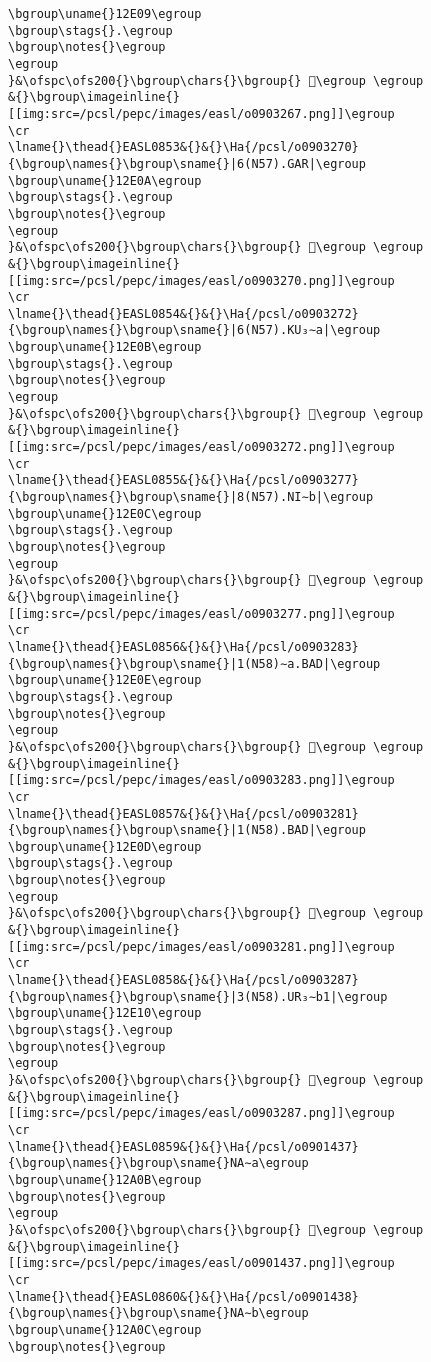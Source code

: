 \begin{verbatim}
\bgroup\uname{}12E09\egroup
\bgroup\stags{}.\egroup
\bgroup\notes{}\egroup
\egroup
}&\ofspc\ofs200{}\bgroup\chars{}\bgroup{} 𒸉\egroup \egroup
&{}\bgroup\imageinline{}[[img:src=/pcsl/pepc/images/easl/o0903267.png]]\egroup
\cr
\lname{}\thead{}EASL0853&{}&{}\Ha{/pcsl/o0903270}{\bgroup\names{}\bgroup\sname{}|6(N57).GAR|\egroup
\bgroup\uname{}12E0A\egroup
\bgroup\stags{}.\egroup
\bgroup\notes{}\egroup
\egroup
}&\ofspc\ofs200{}\bgroup\chars{}\bgroup{} 𒸊\egroup \egroup
&{}\bgroup\imageinline{}[[img:src=/pcsl/pepc/images/easl/o0903270.png]]\egroup
\cr
\lname{}\thead{}EASL0854&{}&{}\Ha{/pcsl/o0903272}{\bgroup\names{}\bgroup\sname{}|6(N57).KU₃∼a|\egroup
\bgroup\uname{}12E0B\egroup
\bgroup\stags{}.\egroup
\bgroup\notes{}\egroup
\egroup
}&\ofspc\ofs200{}\bgroup\chars{}\bgroup{} 𒸋\egroup \egroup
&{}\bgroup\imageinline{}[[img:src=/pcsl/pepc/images/easl/o0903272.png]]\egroup
\cr
\lname{}\thead{}EASL0855&{}&{}\Ha{/pcsl/o0903277}{\bgroup\names{}\bgroup\sname{}|8(N57).NI∼b|\egroup
\bgroup\uname{}12E0C\egroup
\bgroup\stags{}.\egroup
\bgroup\notes{}\egroup
\egroup
}&\ofspc\ofs200{}\bgroup\chars{}\bgroup{} 𒸌\egroup \egroup
&{}\bgroup\imageinline{}[[img:src=/pcsl/pepc/images/easl/o0903277.png]]\egroup
\cr
\lname{}\thead{}EASL0856&{}&{}\Ha{/pcsl/o0903283}{\bgroup\names{}\bgroup\sname{}|1(N58)∼a.BAD|\egroup
\bgroup\uname{}12E0E\egroup
\bgroup\stags{}.\egroup
\bgroup\notes{}\egroup
\egroup
}&\ofspc\ofs200{}\bgroup\chars{}\bgroup{} 𒸎\egroup \egroup
&{}\bgroup\imageinline{}[[img:src=/pcsl/pepc/images/easl/o0903283.png]]\egroup
\cr
\lname{}\thead{}EASL0857&{}&{}\Ha{/pcsl/o0903281}{\bgroup\names{}\bgroup\sname{}|1(N58).BAD|\egroup
\bgroup\uname{}12E0D\egroup
\bgroup\stags{}.\egroup
\bgroup\notes{}\egroup
\egroup
}&\ofspc\ofs200{}\bgroup\chars{}\bgroup{} 𒸍\egroup \egroup
&{}\bgroup\imageinline{}[[img:src=/pcsl/pepc/images/easl/o0903281.png]]\egroup
\cr
\lname{}\thead{}EASL0858&{}&{}\Ha{/pcsl/o0903287}{\bgroup\names{}\bgroup\sname{}|3(N58).UR₃∼b1|\egroup
\bgroup\uname{}12E10\egroup
\bgroup\stags{}.\egroup
\bgroup\notes{}\egroup
\egroup
}&\ofspc\ofs200{}\bgroup\chars{}\bgroup{} 𒸐\egroup \egroup
&{}\bgroup\imageinline{}[[img:src=/pcsl/pepc/images/easl/o0903287.png]]\egroup
\cr
\lname{}\thead{}EASL0859&{}&{}\Ha{/pcsl/o0901437}{\bgroup\names{}\bgroup\sname{}NA∼a\egroup
\bgroup\uname{}12A0B\egroup
\bgroup\notes{}\egroup
\egroup
}&\ofspc\ofs200{}\bgroup\chars{}\bgroup{} 𒨋\egroup \egroup
&{}\bgroup\imageinline{}[[img:src=/pcsl/pepc/images/easl/o0901437.png]]\egroup
\cr
\lname{}\thead{}EASL0860&{}&{}\Ha{/pcsl/o0901438}{\bgroup\names{}\bgroup\sname{}NA∼b\egroup
\bgroup\uname{}12A0C\egroup
\bgroup\notes{}\egroup

\end{verbatim}
